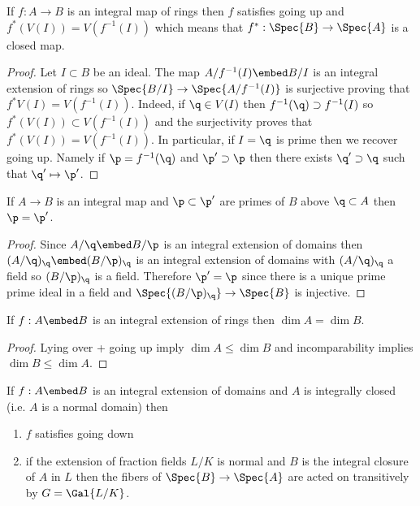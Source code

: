 \documentclass[12pt]{article}
\begin{document}
\begin{cor}[Going Up]
If $f : A \to B$ is an integral map of rings then $f$ satisfies going up and $f^*(V(I)) = V(f^{-1}(I))$ which means that $f^* : \Spec{B} \to \Spec{A}$ is a closed map.
\end{cor}

\begin{proof}
Let $I \subset B$ be an ideal. The map $A / f^{-1}(I) \embed B / I$ is an integral extension of rings so $\Spec{B/I} \to \Spec{A / f^{-1}(I)}$ is surjective proving that $f^* V(I) = V(f^{-1}(I))$. Indeed, if $\q \in V(I)$ then $f^{-1}(\q) \supset f^{-1}(I)$ so $f^*(V(I)) \subset V(f^{-1}(I))$ and the surjectivity proves that $f^*(V(I)) = V(f^{-1}(I))$. In particular, if $I = \q$ is prime then we recover going up. Namely if $\p = f^{-1}(\q)$ and $\p' \supset \p$ then there exists $\q' \supset \q$ such that $\q' \mapsto \p'$. 
\end{proof}

\begin{prop}[Incomparablility]
If $A \to B$ is an integral map and $\p \subset \p'$ are primes of $B$ above $\q \subset A$ then $\p = \p'$.
\end{prop}

\begin{proof}
Since $A / \q \embed B / \p$ is an integral extension of domains then $(A/\q)_\q \embed (B / \p)_\q$ is an integral extension of domains with $(A / \q)_\q$ a field so $(B / \p)_\q$ is a field. Therefore $\p' = \p$ since there is a unique prime prime ideal in a field and $\Spec{(B/\p)_\q} \to \Spec{B}$ is injective.
\end{proof}

\begin{cor}
If $f : A \embed B$ is an integral extension of rings then $\dim{A} = \dim{B}$.
\end{cor}

\begin{proof}
Lying over + going up imply $\dim{A} \le \dim{B}$ and incomparability implies $\dim{B} \le \dim{A}$. 
\end{proof}

\begin{prop} 
If $f : A \embed B$ is an integral extension of domains and $A$ is integrally closed (i.e. $A$ is a normal domain) then
\begin{enumerate}
\item $f$ satisfies going down
\item if the extension of fraction fields $L / K$ is normal and $B$ is the integral closure of $A$ in $L$ then the fibers of $\Spec{B} \to \Spec{A}$ are acted on transitively by $G = \Gal{L/K}$.
\end{enumerate}
\end{prop}
\end{document}
